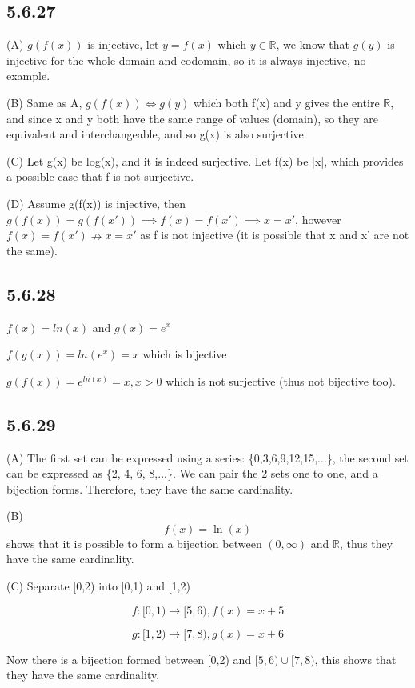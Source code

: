 \documentclass{article}
\begin{document}
\subsection*{5.6.27}

(A) $g(f(x))$ is injective, let $y=f(x)$ which $y\in\mathbb{R}$, we know that $g(y)$ is injective for the whole domain and codomain, so it is always injective, no example.

(B) Same as A, $g(f(x))\iff g(y)$ which both f(x) and y gives the entire $\mathbb{R}$, and since x and y both have the same range of values (domain), so they are equivalent and interchangeable, and so g(x) is also surjective.

(C) Let g(x) be log(x), and it is indeed surjective. Let f(x) be |x|, which provides a possible case that f is not surjective.

(D) Assume g(f(x)) is injective, then $g(f(x))=g(f(x'))\implies f(x)=f(x')\implies x=x'$, however $ f(x)=f(x') \nrightarrow x=x'$ as f is not injective (it is possible that x and x' are not the same). 

\subsection*{5.6.28}

$f(x)=ln(x)$ and $g(x)=e^x$

$f(g(x))=ln(e^x)=x$ which is bijective

$g(f(x))=e^{ln(x)}=x, x>0$ which is not surjective (thus not bijective too).

\subsection*{5.6.29}

(A) The first set can be expressed using a series: \{0,3,6,9,12,15,...\}, the second set can be expressed as \{2, 4, 6, 8,...\}. We can pair the 2 sets one to one, and a bijection forms. Therefore, they have the same cardinality.

(B) $$f\left(x\right)=\ln\left(x\right)$$ shows that it is possible to form a bijection between $(0,\infty)$ and $\mathbb{R}$, thus they have the same cardinality.

(C) Separate [0,2) into [0,1) and [1,2)

$$f: [0,1)\rightarrow [5,6), f(x)=x+5$$

$$g: [1,2)\rightarrow [7,8), g(x)=x+6$$

Now there is a bijection formed between [0,2) and $[5,6)\cup [7,8)$, this shows that they have the same cardinality. 
\end{document}
